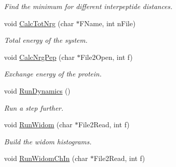 \begin{DoxyCompactItemize}
\begin{DoxyCompactList}\small\item\em \-Find the minimum for different interpeptide distances. \end{DoxyCompactList}\item 
\hypertarget{classForces_aa82709db8e55cc620cfbfb483489f5b6}{void \hyperlink{classForces_aa82709db8e55cc620cfbfb483489f5b6}{\-Calc\-Tot\-Nrg} (char $\ast$\-F\-Name, int n\-File)}\label{classForces_aa82709db8e55cc620cfbfb483489f5b6}

\begin{DoxyCompactList}\small\item\em \-Total energy of the system. \end{DoxyCompactList}\item 
\hypertarget{classForces_a6a491826bd0df50e5d4941710783a54c}{void \hyperlink{classForces_a6a491826bd0df50e5d4941710783a54c}{\-Calc\-Nrg\-Pep} (char $\ast$\-File2\-Open, int f)}\label{classForces_a6a491826bd0df50e5d4941710783a54c}

\begin{DoxyCompactList}\small\item\em \-Exchange energy of the protein. \end{DoxyCompactList}\item 
\hypertarget{classForces_aadef342da0e2abb136031d2df4c264bf}{void \hyperlink{classForces_aadef342da0e2abb136031d2df4c264bf}{\-Run\-Dynamics} ()}\label{classForces_aadef342da0e2abb136031d2df4c264bf}

\begin{DoxyCompactList}\small\item\em \-Run a step further. \end{DoxyCompactList}\item 
\hypertarget{classForces_abfa5f0b075c87a5ae914d91c5481c359}{void \hyperlink{classForces_abfa5f0b075c87a5ae914d91c5481c359}{\-Run\-Widom} (char $\ast$\-File2\-Read, int f)}\label{classForces_abfa5f0b075c87a5ae914d91c5481c359}

\begin{DoxyCompactList}\small\item\em \-Build the widom histograms. \end{DoxyCompactList}\item 
\hypertarget{classForces_ac313c324785f5c7c044e2e94ea39c01c}{void \hyperlink{classForces_ac313c324785f5c7c044e2e94ea39c01c}{\-Run\-Widom\-Ch\-In} (char $\ast$\-File2\-Read, int f)}\label{classForces_ac313c324785f5c7c044e2e94ea39c01c}


\end{DoxyCompactItemize}
